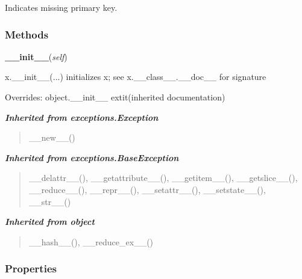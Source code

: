 Indicates missing primary key.



  \subsubsection{Methods}

    \vspace{0.5ex}

\hspace{.8\funcindent}\begin{boxedminipage}{\funcwidth}

    \raggedright \textbf{\_\_init\_\_}(\textit{self})

\setlength{\parskip}{2ex}
    x.\_\_init\_\_(...) initializes x; see x.\_\_class\_\_.\_\_doc\_\_ for 
    signature

\setlength{\parskip}{1ex}
      Overrides: object.\_\_init\_\_ 	extit{(inherited documentation)}

    \end{boxedminipage}


\large{\textbf{\textit{Inherited from exceptions.Exception}}}

\begin{quote}
\_\_new\_\_()
\end{quote}

\large{\textbf{\textit{Inherited from exceptions.BaseException}}}

\begin{quote}
\_\_delattr\_\_(), \_\_getattribute\_\_(), \_\_getitem\_\_(), \_\_getslice\_\_(), \_\_reduce\_\_(), \_\_repr\_\_(), \_\_setattr\_\_(), \_\_setstate\_\_(), \_\_str\_\_()
\end{quote}

\large{\textbf{\textit{Inherited from object}}}

\begin{quote}
\_\_hash\_\_(), \_\_reduce\_ex\_\_()
\end{quote}


  \subsubsection{Properties}

